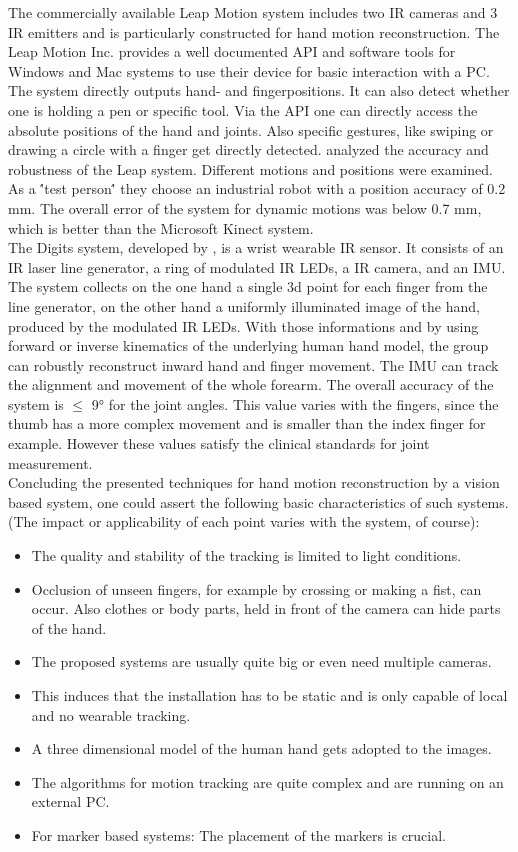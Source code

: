 The commercially available Leap Motion system \cite{leap} includes two IR cameras and 3 IR emitters and is particularly constructed for hand motion reconstruction. The Leap Motion Inc. provides a well documented API and software tools for Windows and Mac systems to use their device for basic interaction with a PC. The system directly outputs hand- and fingerpositions. It can also detect whether one is holding a pen or specific tool. Via the API one can directly access the absolute positions of the hand and joints. Also specific gestures, like swiping or drawing a circle with a finger get directly detected. \cite{weichert2013analysis} analyzed the accuracy and robustness of the Leap system. Different motions and positions were examined. As a \''test person\'' they choose an industrial robot with a position accuracy of 0.2 mm. The overall error of the system for dynamic motions was below 0.7 mm, which is better than the Microsoft Kinect system.\\
The Digits system, developed by \cite{Digits}, is a wrist wearable IR sensor. It consists of an IR laser line generator, a ring of modulated IR LEDs, a IR camera, and an IMU. The system collects on the one hand a single 3d point for each finger from the line generator, on the other hand a uniformly illuminated image of the hand, produced by the modulated IR LEDs. With those informations and by using forward or inverse kinematics of the underlying human hand model, the group can robustly reconstruct inward hand and finger movement. The IMU can track the alignment and movement of the whole forearm. The overall accuracy of the system is $ \leq $ 9° for the joint angles. This value varies with the fingers, since the thumb has a more complex movement and is smaller than the index finger for example. However these values satisfy the clinical standards for joint measurement.\\

Concluding the presented techniques for hand motion reconstruction by a vision based system, one could assert the following basic characteristics of such systems. (The impact or applicability of each point varies with the system, of course):
\begin{itemize}
\item The quality and stability of the tracking is limited to light conditions.
\item Occlusion of unseen fingers, for example by crossing or making a fist, can occur. Also clothes or body parts, held in front of the camera can hide parts of the hand.
\item The proposed systems are usually quite big or even need multiple cameras.
\item This induces that the installation has to be static and is only capable of local and no wearable tracking.
\item A three dimensional model of the human hand gets adopted to the images.
\item The algorithms for motion tracking are quite complex and are running on an external PC.
\item For marker based systems: The placement of the markers is crucial.
\end{itemize}


